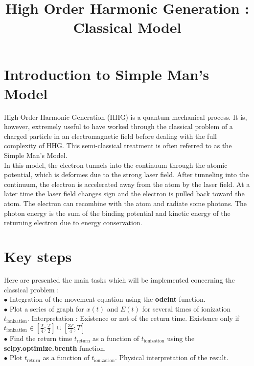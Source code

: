 \documentclass[a4paper,12pt]{article}
\title{High Order Harmonic Generation : Classical Model}
\begin{document}
\maketitle

\section{Introduction to Simple Man's Model}

High Order Harmonic Generation (HHG) is a quantum mechanical process. It is, however, extremely useful to have worked through the classical problem of a charged particle in an electromagnetic field before dealing with the full complexity of HHG. This semi-classical treatment is often referred to as the Simple Man's Model.\\
In this model, the electron tunnels into the continuum through the atomic potential, which is deformes due to the strong laser field. After tunneling into the continuum, the electron is accelerated away from the atom by the laser field. At a later time the laser field changes sign and the electron is pulled back toward the atom. The electron can recombine with the atom and radiate some photons. The photon energy is the sum of the binding potential and kinetic energy of the returning electron due to energy conservation.

\section{Key steps}
Here are presented the main tasks which will be implemented concerning the classical problem :\\

$\bullet$ Integration of the movement equation using the \textbf{odeint} function.\\

$\bullet$ Plot a series of graph for $x(t)$ and $E(t)$ for several times of ionization $t_{\mathrm{ionization}}$. Interpretation : Existence or not of the return time. Existence only if $t_{\mathrm{ionization}} \in \left[\frac{T}{4};\frac{T}{2}\right] \cup \left[\frac{3T}{4};T\right]$ \\

$\bullet$ Find the return time $t_{\mathrm{return}}$ as a function of $t_{\mathrm{ionization}}$ using the \textbf{scipy.optimize.brenth} function.\\

$\bullet$ Plot $t_{\mathrm{return}}$ as a function of $t_{\mathrm{ionization}}$. Physical interpretation of the result.\\
\end{document}
